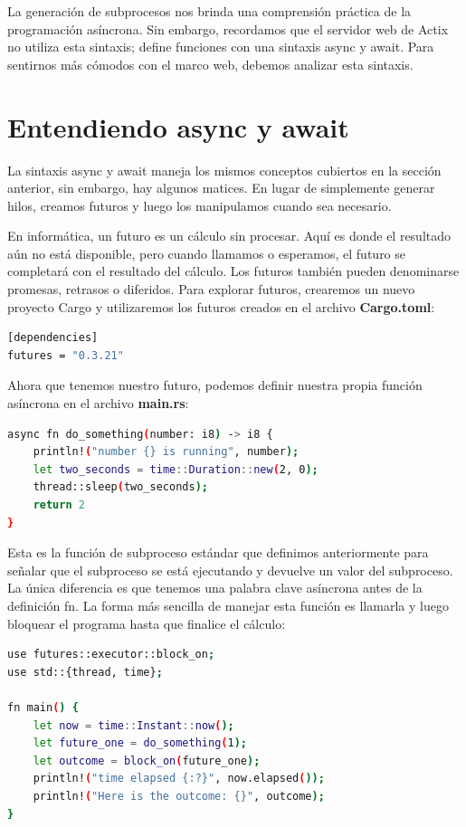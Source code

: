 La generación de subprocesos nos brinda una comprensión práctica de la programación asíncrona. Sin embargo, recordamos que el servidor web de Actix no utiliza esta sintaxis; define funciones con una sintaxis async y await. Para sentirnos más cómodos con el marco web, debemos analizar esta sintaxis.

\section{Entendiendo async y await}

La sintaxis async y await maneja los mismos conceptos cubiertos en la sección anterior, sin embargo, hay algunos matices. En lugar de simplemente generar hilos, creamos futuros y luego los manipulamos cuando sea necesario.

En informática, un futuro es un cálculo sin procesar. Aquí es donde el resultado aún no está disponible, pero cuando llamamos o esperamos, el futuro se completará con el resultado del cálculo. Los futuros también pueden denominarse promesas, retrasos o diferidos. Para explorar futuros, crearemos un nuevo proyecto Cargo y utilizaremos los futuros creados en el archivo \textbf{Cargo.toml}:

\begin{lstlisting}[language=bash]
[dependencies]
futures = "0.3.21"
\end{lstlisting}

Ahora que tenemos nuestro futuro, podemos definir nuestra propia función asíncrona en el archivo \textbf{main.rs}:

\begin{lstlisting}[language=bash]
async fn do_something(number: i8) -> i8 {
	println!("number {} is running", number);
	let two_seconds = time::Duration::new(2, 0);
	thread::sleep(two_seconds);
	return 2
}
\end{lstlisting}

Esta es la función de subproceso estándar que definimos anteriormente para señalar que el subproceso se está ejecutando y devuelve un valor del subproceso. La única diferencia es que tenemos una palabra clave asíncrona antes de la definición fn. La forma más sencilla de manejar esta función es llamarla y luego bloquear el programa hasta que finalice el cálculo:

\begin{lstlisting}[language=bash]
use futures::executor::block_on;
use std::{thread, time};

fn main() {
	let now = time::Instant::now();
	let future_one = do_something(1);
	let outcome = block_on(future_one);
	println!("time elapsed {:?}", now.elapsed());
	println!("Here is the outcome: {}", outcome);
}
\end{lstlisting}

